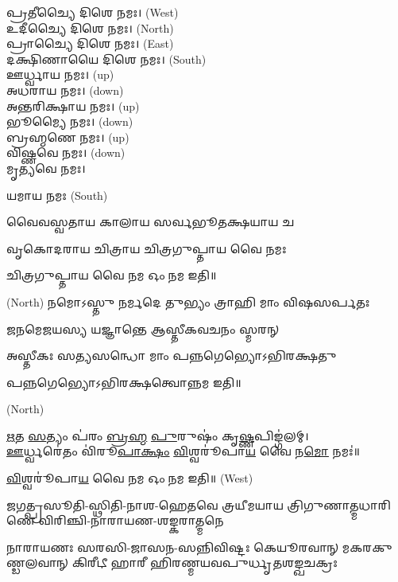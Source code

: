 𑌪𑍍𑌰𑌤𑍀𑌚𑍍𑌯𑍈 𑌦𑌿𑌶𑍇 𑌨𑌮𑌃।   {\scriptsize (West)}\\
𑌉𑌦𑍀𑌚𑍍𑌯𑍈 𑌦𑌿𑌶𑍇 𑌨𑌮𑌃।   {\scriptsize (North)}\\
𑌪𑍍𑌰𑌾𑌚𑍍𑌯𑍈 𑌦𑌿𑌶𑍇 𑌨𑌮𑌃।   {\scriptsize (East)}\\
𑌦𑌕𑍍𑌷𑌿𑌣𑌾𑌯𑍈 𑌦𑌿𑌶𑍇 𑌨𑌮𑌃।  {\scriptsize (South)}\\
𑌊𑌰𑍍𑌧𑍍𑌵𑌾𑌯 𑌨𑌮𑌃।   {\scriptsize (up)}\\
𑌅𑌧𑌰𑌾𑌯 𑌨𑌮𑌃।   {\scriptsize (down)}\\
𑌅𑌨𑍍𑌤𑌰𑌿𑌕𑍍𑌷𑌾𑌯 𑌨𑌮𑌃। {\scriptsize (up)}\\
𑌭𑍂𑌮𑍍𑌯𑍈 𑌨𑌮𑌃। {\scriptsize (down)}\\
𑌬𑍍𑌰𑌹𑍍𑌮𑌣𑍇 𑌨𑌮𑌃। {\scriptsize (up)}\\
𑌵𑌿𑌷𑍍𑌣𑌵𑍇 𑌨𑌮𑌃।  {\scriptsize (down)}\\
𑌮𑍃𑌤𑍍𑌯𑌵𑍇 𑌨𑌮𑌃।

𑌯𑌮𑌾𑌯 𑌨𑌮𑌃   {\scriptsize (South)}

{𑌵𑍈𑌵𑌸𑍍𑌵𑌤𑌾𑌯   𑌕𑌾𑌲𑌾𑌯   𑌸𑌰𑍍𑌵𑌭𑍂𑌤𑌕𑍍𑌷𑌯𑌾𑌯   𑌚}

{𑌵𑍃𑌕𑍋𑌦𑌰𑌾𑌯   𑌚𑌿𑌤𑍍𑌰𑌾𑌯   𑌚𑌿𑌤𑍍𑌰𑌗𑍁𑌪𑍍𑌤𑌾𑌯   𑌵𑍈  𑌨𑌮𑌃}

𑌚𑌿𑌤𑍍𑌰𑌗𑍁𑌪𑍍𑌤𑌾𑌯   𑌵𑍈  𑌨𑌮 𑌓𑌂 𑌨𑌮 𑌇𑌤𑌿॥

 {\scriptsize (North)}
{𑌨𑌮𑍋𑌽𑌸𑍍𑌤𑍁 𑌨𑌰𑍍𑌮𑌦𑍇 𑌤𑍁𑌭𑍍𑌯𑌂 𑌤𑍍𑌰𑌾𑌹𑌿 𑌮𑌾𑌂 𑌵𑌿𑌷𑌸𑌰𑍍𑌪𑌤𑌃}

{𑌜𑌨𑌮𑍇𑌜𑌯𑌸𑍍𑌯 𑌯𑌜𑍍𑌞𑌾𑌨𑍍𑌤𑍇 𑌆𑌸𑍍𑌤𑍀𑌕𑌵𑌚𑌨𑌂 𑌸𑍍𑌮𑌰𑌨𑍍}


{𑌅𑌸𑍍𑌤𑍀𑌕𑌃 𑌸𑌤𑍍𑌯𑌸𑌨𑍍𑌧𑍋 𑌮𑌾𑌂 𑌪𑌨𑍍𑌨𑌗𑍇𑌭𑍍𑌯𑍋𑌽𑌭𑌿𑌰𑌕𑍍𑌷𑌤𑍁}

𑌪𑌨𑍍𑌨𑌗𑍇𑌭𑍍𑌯𑍋𑌽𑌭𑌿𑌰𑌕𑍍𑌷𑌤𑍍𑌵𑍋𑌨𑍍𑌨𑌮 𑌇𑌤𑌿॥

 {\scriptsize (North)}

\ul{𑌋}𑌤 \ul{𑌸}𑌤𑍍𑌯𑌂 𑌪॑𑌰𑌂 \ul{𑌬𑍍𑌰}\ul{𑌹𑍍𑌮} \ul{𑌪𑍁}𑌰𑍁𑌷𑌂॑ 𑌕𑍃\ul{𑌷𑍍𑌣}𑌪𑌿𑌙𑍍𑌗॑𑌲𑌮𑍍।\\
\ul{𑌊}𑌰𑍍𑌧𑍍𑌵𑌰𑍇॑𑌤𑌂 𑌵𑌿॑𑌰𑍂\ul{𑌪𑌾}\ul{𑌕𑍍𑌷𑌂} \ul{𑌵𑌿}𑌶𑍍𑌵𑌰𑍂॑𑌪𑌾\ul{𑌯} 𑌵𑍈 𑌨\ul{𑌮𑍋} 𑌨𑌮𑌃॑॥


\ul{𑌵𑌿}𑌶𑍍𑌵𑌰𑍂॑𑌪𑌾\ul{𑌯} 𑌵𑍈 𑌨𑌮 𑌓𑌂 𑌨𑌮 𑌇𑌤𑌿॥
{\scriptsize (West)}

{𑌜𑌗𑌤𑍍𑌪𑍍𑌰𑌸𑍂𑌤𑌿-𑌸𑍍𑌥𑌿𑌤𑌿-𑌨𑌾𑌶-𑌹𑍇𑌤𑌵𑍇}
{𑌤𑍍𑌰𑌯𑍀𑌮𑌯𑌾𑌯 𑌤𑍍𑌰𑌿𑌗𑍁𑌣𑌾𑌤𑍍𑌮𑌧𑌾𑌰𑌿𑌣𑍇}
{𑌵𑌿𑌰𑌿𑌞𑍍𑌚𑌿-𑌨𑌾𑌰𑌾𑌯𑌣-𑌶𑌙𑍍𑌕𑌰𑌾𑌤𑍍𑌮𑌨𑍇}

{𑌨𑌾𑌰𑌾𑌯𑌣𑌃 𑌸𑌰𑌸𑌿-𑌜𑌾𑌸𑌨-𑌸𑌨𑍍𑌨𑌿𑌵𑌿𑌷𑍍𑌟𑌃}
{𑌕𑍇𑌯𑍂𑌰𑌵𑌾𑌨𑍍 𑌮𑌕𑌰𑌕𑍁𑌣𑍍𑌡𑌲𑌵𑌾𑌨𑍍 𑌕𑌿𑌰𑍀𑌟𑍀}
{𑌹𑌾𑌰𑍀 𑌹𑌿𑌰𑌣𑍍𑌮𑌯𑌵𑌪𑍁𑌰𑍍𑌧𑍃𑌤𑌶𑌙𑍍𑌖𑌚𑌕𑍍𑌰𑌃}

